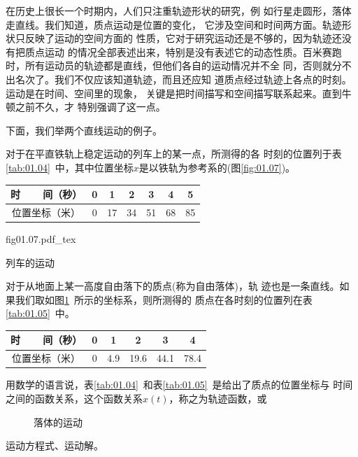 在历史上很长一个时期内，人们只注重轨迹形状的研究，例
如行星走圆形，落体走直线。我们知道，质点运动是位置的变化，
它涉及空间和时间两方面。轨迹形状只反映了运动的空间方面的
性质，它对于研究运动还是不够的，因为轨迹还没有把质点运动
的情况全部表述出来，特别是没有表述它的动态性质。百米赛跑
时，所有运动员的轨迹都是直线，但他们各自的运动情况并不全
同，否则就分不出名次了。我们不仅应该知道轨迹，而且还应知
道质点经过轨迹上各点的时刻。运动是在时间、空间里的现象，
关键是把时间描写和空间描写联系起来。直到牛顿之前不久，才
特别强调了这一点。

下面，我们举两个直线运动的例子。

对于在平直铁轨上稳定运动的列车上的某一点，所测得的各
时刻的位置列于表\ref{tab:01.04}~中，其中位置坐标$x$是以铁轨为参考系的(图\ref{fig:01.07})。
\vspace{-1em}
\begin{tablex}[!h]{1.1em}
    \caption{}
    \label{tab:01.04}
    \centering
        \begin{tabular}{c|c|c|c|c|c|c}
            \toprule
            时~~~~间（秒） & 0 & 1  & 2  & 3  & 4  & 5  \\
            \midrule
            位置坐标（米） & 0 & 17 & 34 & 51 & 68 & 85 \\
            \bottomrule
        \end{tabular}
\end{tablex}

\begin{figurex}[!h]
    \centering
    {fig01.07.pdf_tex}
    \caption{列车的运动}
    \label{fig:01.07}
\end{figurex}

对于从地面上某一高度自由落下的质点(称为自由落体)，轨
迹也是一条直线。如果我们取如图\ref{fig:01.08}~所示的坐标系，则所测得的
质点在各时刻的位置列在表\ref{tab:01.05}~中。
\begin{tablex}[!h]{1.15em}
    \caption{}
    \label{tab:01.05}
    \centering
        \begin{tabular}{c|c|c|c|c|c}
            \toprule
            时~~~~间（秒） & 0 & 1   & 2    & 3    & 4    \\
            \midrule
            位置坐标（米） & 0 & 4.9 & 19.6 & 44.1 & 78.4 \\
            \bottomrule
        \end{tabular}
\end{tablex}

用数学的语言说，表\ref{tab:01.04}~和表\ref{tab:01.05}~是给出了质点的位置坐标与
时间之间的函数关系，这个函数关系$x(t)$，称之为轨迹函数，或
\begin{figure}
    \centering
    \caption{落体的运动}
    \label{fig:01.08}
\end{figure}
运动方程式、运动解。

